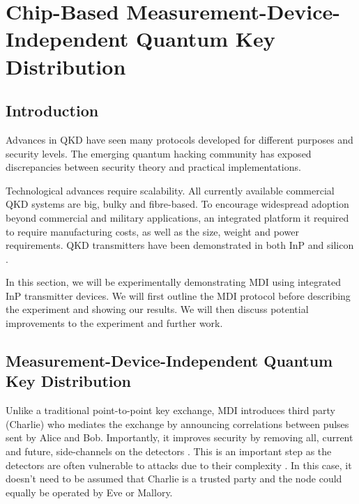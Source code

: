 %
%
\graphicspath{{./chapters/chapter04/fig04/}}

\let\textcircled=\pgftextcircled
\chapter[Chip-Based Measurement-Device-Independent QKD]{Chip-Based Measurement-Device-Independent Quantum Key Distribution}
\label{chap:mdiqkd}

\section{Introduction}

Advances in \ac{QKD} have seen many protocols developed for different purposes and security levels. The emerging quantum hacking community has exposed discrepancies between security theory and practical implementations. 

Technological advances require scalability. All currently available commercial \ac{QKD} systems are big, bulky and fibre-based. To encourage widespread adoption beyond commercial and military applications, an integrated platform it required to require manufacturing costs, as well as the size, weight and power requirements. \ac{QKD} transmitters have been demonstrated in both \ac{InP} \cite{Sibson2017InP} and silicon \cite{Sibson2017Si}.

In this section, we will be experimentally demonstrating \ac{MDI} \cite{mdi-qkd} using integrated \ac{InP} transmitter devices. We will first outline the \ac{MDI} protocol before describing the experiment and showing our results. We will then discuss potential improvements to the experiment and further work.

\section{Measurement-Device-Independent Quantum Key Distribution}
\label{sec:mdi-qkd}

Unlike a traditional point-to-point key exchange, \ac{MDI} introduces third party (Charlie) who mediates the exchange by announcing correlations between pulses sent by Alice and Bob. Importantly, it improves security by removing all, current and future, side-channels on the detectors \cite{mdi-qkd}. This is an important step as the detectors are often vulnerable to attacks due to their complexity \cite{Lydersen2010a, Makarov2006}. In this case, it doesn't need to be assumed that Charlie is a trusted party and the node could equally be operated by Eve or Mallory.

